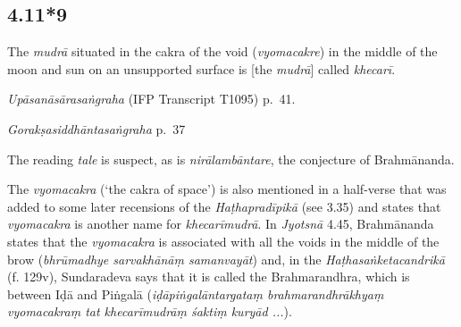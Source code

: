 \begin{ekdosis}
\subsection*{4.11*9}
\begin{translation}[hp04_011_9]
The \emph{mudrā} situated in the cakra of the void (\emph{vyomacakre}) in the middle of the moon and sun on an unsupported surface is [the \emph{mudrā}] called \emph{khecarī}.
\end{translation}


\begin{testimonia}[hp04_011_9]
\emph{Upāsanāsārasaṅgraha} (IFP Transcript T1095) p.~41.
\begin{versinnote}
\end{versinnote}

\emph{Gorakṣasiddhāntasaṅgraha} p.~37
\begin{versinnote}
\end{versinnote}
\end{testimonia}

\begin{philcomm}[hp04_011_9]
The reading \emph{tale} is suspect, as is \emph{nirālambāntare}, the conjecture of Brahmānanda.

The \emph{vyomacakra} (`the cakra of space') is also mentioned in a half-verse that was added to some later recensions of the \emph{Haṭhapradīpikā} (see 3.35) and states that \emph{vyomacakra} is another name for \emph{khecarīmudrā}. In \emph{Jyotsnā} 4.45, Brahmānanda states that the \emph{vyomacakra} is associated with all the voids in the middle of the brow (\emph{bhrūmadhye sarvakhānāṃ samanvayāt}) and, in the \emph{Haṭhasaṅketacandrikā} (f. 129v), Sundaradeva says that it is called the Brahmarandhra, which is between Iḍā and Piṅgalā (\emph{iḍāpiṅgalāntargataṃ brahmarandhrākhyaṃ vyomacakraṃ tat khecarīmudrāṃ śaktiṃ kuryād ...}). 
\end{philcomm}


\end{ekdosis}
